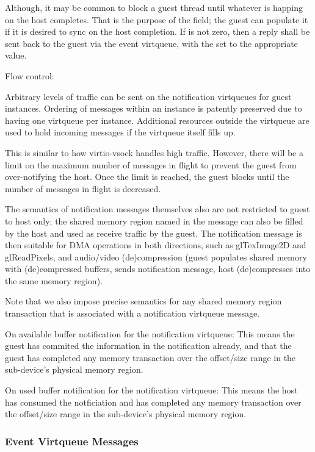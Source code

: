 Although, it may be common to block a guest thread until whatever is happing on the host completes.
That is the purpose of the  field; the guest can populate it
if it is desired to sync on the host completion.
If  is not zero, then a reply shall be sent
back to the guest via the event virtqueue,
with the  set to the appropriate value.

Flow control:

Arbitrary levels of traffic can be sent
on the notification virtqueues for guest instances.
Ordering of messages within an instance is patently preserved
due to having one virtqueue per instance.
Additional resources outside the virtqueue are used to hold incoming messages
if the virtqueue itself fills up.

This is similar to how virtio-vsock handles high traffic.
However, there will be a limit on the maximum number of messages in flight
to prevent the guest from over-notifying the host.
Once the limit is reached, the guest blocks until the number of messages in flight
is decreased.

The semantics of notification messages themselves also are not restricted to guest to host only;
the shared memory region named in the message can also be filled by the host
and used as receive traffic by the guest.
The notification message is then suitable for DMA operations in both directions,
such as glTexImage2D and glReadPixels,
and audio/video (de)compression (guest populates shared memory with (de)compressed buffers,
sends notification message, host (de)compresses into the same memory region).

Note that we also impose precise semantics for any shared memory region transaction
that is associated with a notification virtqueue message.

On available buffer notification for the notification virtqueue:
This means the guest has commited the information in the notification already,
and that the guest has completed
any memory transaction over the offset/size range in the sub-device's physical memory region.

On used buffer notification for the notification virtqueue:
This means the host has consumed the notficiation and has completed
any memory transaction over the offset/size range in the sub-device's physical memory region.

\subsubsection{Event Virtqueue Messages}\label{sec:Device Types / Host Memory Device / Device Operation / Event Virtqueue Messages}

